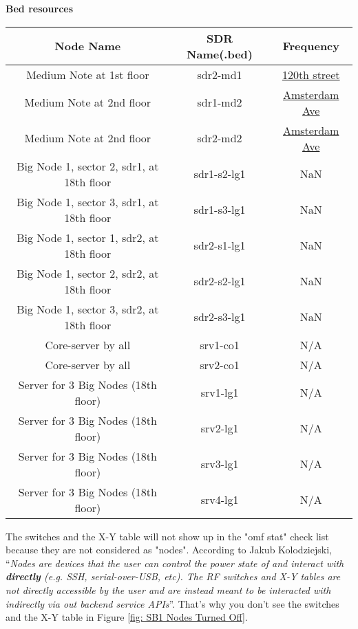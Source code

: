 \documentclass{article}
\begin{document}
    
    \textbf{Bed resources}
    \begin{center}
        \begin{tabular}{||c c c||} 
            \hline
            \textbf{Node Name} & \textbf{SDR Name(.bed)} & Frequency\\ [0.5ex] 
            \hline\hline
            Medium Note at 1st floor & sdr2-md1 & \href{https://wiki.cosmos-lab.org/wiki/Architecture/Naming}{120th street} \\
            \hline
            Medium Note at 2nd floor & sdr1-md2 & \href{https://wiki.cosmos-lab.org/wiki/Architecture/Naming}{Amsterdam Ave} \\
            \hline
            Medium Note at 2nd floor & sdr2-md2 & \href{https://wiki.cosmos-lab.org/wiki/Architecture/Naming}{Amsterdam Ave} \\
            \hline
            Big Node 1, sector 2, sdr1, at 18th floor & sdr1-s2-lg1 & NaN \\
            \hline
            Big Node 1, sector 3, sdr1, at 18th floor & sdr1-s3-lg1 & NaN \\
            \hline
            Big Node 1, sector 1, sdr2, at 18th floor & sdr2-s1-lg1 & NaN \\
            \hline
            Big Node 1, sector 2, sdr2, at 18th floor & sdr2-s2-lg1 & NaN \\
            \hline
            Big Node 1, sector 3, sdr2, at 18th floor & sdr2-s3-lg1 & NaN \\
            \hline
            Core-server by all & srv1-co1 & N/A \\ 
            \hline
            Core-server by all & srv2-co1 & N/A \\ 
            \hline
            Server for 3 Big Nodes (18th floor) & srv1-lg1 & N/A \\ 
            \hline
            Server for 3 Big Nodes (18th floor) & srv2-lg1 & N/A \\ 
            \hline
            Server for 3 Big Nodes (18th floor) & srv3-lg1 & N/A \\ 
            \hline
            Server for 3 Big Nodes (18th floor) & srv4-lg1 & N/A \\ [1ex]
            \hline
        \end{tabular}
    \end{center}

    The switches and the X-Y table will not show up in the "omf stat" check list because they are not considered as "nodes". According to Jakub Kolodziejski, ``\emph{Nodes are devices that the user can control the power state of and interact with \textbf{directly} (e.g. SSH, serial-over-USB, etc). The RF switches and X-Y tables are not directly accessible by the user and are instead meant to be interacted with indirectly via out backend service APIs}''. That's why you don't see the switches and the X-Y table in Figure \ref{fig: SB1 Nodes Turned Off}.
\end{document}
